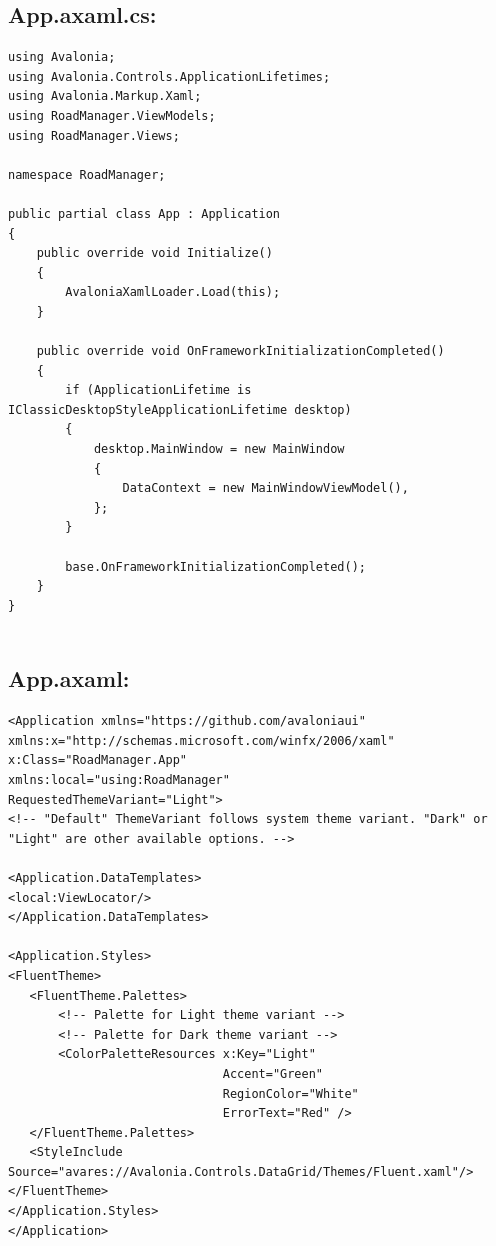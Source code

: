 \documentclass[14pt]{extarticle}
\begin{document}
\subsection{App.axaml.cs:}
\begin{verbatim}
using Avalonia;
using Avalonia.Controls.ApplicationLifetimes;
using Avalonia.Markup.Xaml;
using RoadManager.ViewModels;
using RoadManager.Views;

namespace RoadManager;

public partial class App : Application
{
    public override void Initialize()
    {
        AvaloniaXamlLoader.Load(this);
    }

    public override void OnFrameworkInitializationCompleted()
    {
        if (ApplicationLifetime is IClassicDesktopStyleApplicationLifetime desktop)
        {
            desktop.MainWindow = new MainWindow
            {
                DataContext = new MainWindowViewModel(),
            };
        }

        base.OnFrameworkInitializationCompleted();
    }
}
    
\end{verbatim}
\subsection{App.axaml:}
\begin{verbatim}
<Application xmlns="https://github.com/avaloniaui"
xmlns:x="http://schemas.microsoft.com/winfx/2006/xaml"
x:Class="RoadManager.App"
xmlns:local="using:RoadManager"
RequestedThemeVariant="Light">
<!-- "Default" ThemeVariant follows system theme variant. "Dark" or "Light" are other available options. -->

<Application.DataTemplates>
<local:ViewLocator/>
</Application.DataTemplates>

<Application.Styles>
<FluentTheme>
   <FluentTheme.Palettes>
       <!-- Palette for Light theme variant -->
       <!-- Palette for Dark theme variant -->
       <ColorPaletteResources x:Key="Light"
                              Accent="Green" 
                              RegionColor="White" 
                              ErrorText="Red" />            
   </FluentTheme.Palettes>
   <StyleInclude Source="avares://Avalonia.Controls.DataGrid/Themes/Fluent.xaml"/>
</FluentTheme>
</Application.Styles>
</Application> 
\end{verbatim}
\end{document}
